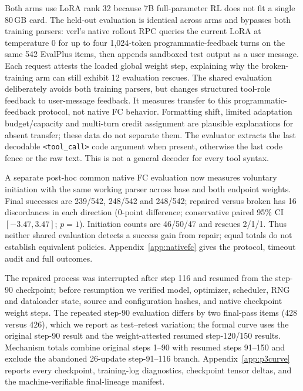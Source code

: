 Both arms use LoRA rank 32 because 7B full-parameter RL does not fit a single 80\,GB card. The
held-out evaluation is identical across arms and bypasses both training parsers: verl's native
rollout RPC queries the current LoRA at temperature 0 for up to four 1,024-token
programmatic-feedback turns on the same 542 EvalPlus items, then appends sandboxed test output as
a user message. Each request attests the loaded global weight step, explaining why the
broken-training arm can still exhibit 12 evaluation rescues.
The shared evaluation deliberately avoids both training parsers, but changes structured tool-role
feedback to user-message feedback. It measures transfer to this programmatic-feedback protocol,
not native FC behavior. Formatting shift, limited adaptation budget/capacity and multi-turn
credit assignment are plausible explanations for absent transfer; these data do not separate them.
The evaluator extracts the last decodable \texttt{<tool\_call>} code argument when present,
otherwise the last code fence or the raw text. This is not a general decoder for every tool syntax.

A separate post-hoc common native FC evaluation now measures voluntary initiation
with the same working parser across base and both endpoint weights. Final successes
are 239/542, 248/542 and 248/542; repaired versus broken has 16 discordances in each
direction (0-point difference; conservative paired 95\% CI $[-3.47,3.47]$; $p=1$).
Initiation counts are 46/50/47 and rescues 2/1/1. Thus neither shared evaluation
detects a success gain from repair; equal totals do not establish equivalent policies.
Appendix~\ref{app:nativefc} gives the protocol, timeout audit and full outcomes.


The repaired process was interrupted
after step 116 and resumed from the step-90 checkpoint; before
resumption we verified model, optimizer, scheduler, RNG and dataloader state, source and
configuration hashes, and native checkpoint weight steps. The repeated step-90 evaluation differs
by two final-pass items (428 versus 426), which we report as test--retest variation; the formal
curve uses the original step-90 result and the weight-attested resumed step-120/150 results.
Mechanism totals combine original steps 1--90 with resumed steps 91--150 and exclude the abandoned
26-update step-91--116 branch. Appendix~\ref{app:p3curve} reports every checkpoint, training-log
diagnostics, checkpoint tensor deltas, and the machine-verifiable final-lineage manifest.
